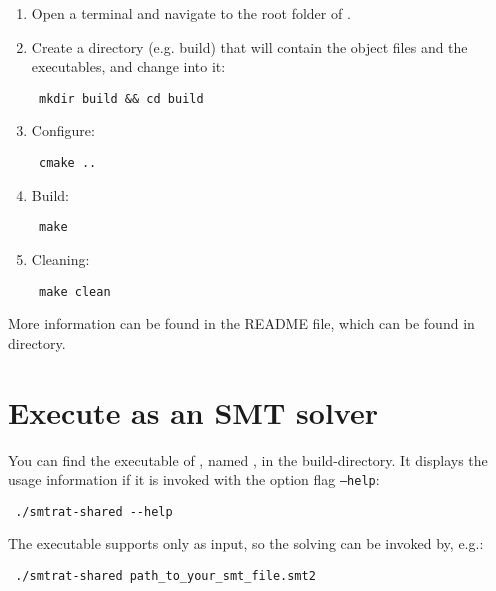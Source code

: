 \begin{enumerate}
	\item Open a terminal and navigate to the root folder of \smtrat.
	\item Create a directory (e.g. build) that will contain the object files and the executables, and change into it:
		\begin{verbatim} mkdir build && cd build\end{verbatim}
	\item Configure:
		\begin{verbatim} cmake .. \end{verbatim}
	\item Build: 
		\begin{verbatim} make \end{verbatim}
	\item Cleaning: 
		\begin{verbatim} make clean \end{verbatim}
\end{enumerate}

More information can be found in the README file, which can be found in \smtrat directory.

\section{Execute \smtrat as an SMT solver}
You can find the executable of \smtrat, named \smtratSolverName, in the build-directory. It displays the usage information if it is invoked with the option flag \texttt{--help}:
\begin{verbatim} ./smtrat-shared --help\end{verbatim}
The executable supports only \smtlibFiles as input, so the solving can be invoked by, e.g.:
\begin{verbatim} ./smtrat-shared path_to_your_smt_file.smt2\end{verbatim}

